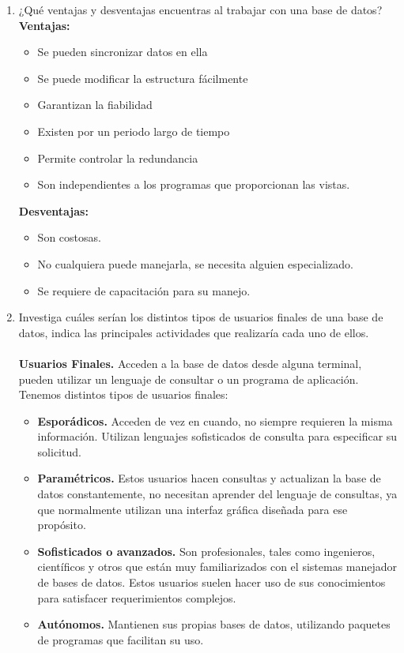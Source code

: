 \documentclass[12pt]{article}
\begin{document}
\begin{enumerate}
	\item ¿Qué ventajas y desventajas encuentras al trabajar con una
	 base de datos?\\
	 \textbf{Ventajas:}
	 \begin{itemize}
	 	\item Se pueden sincronizar datos en ella
	 	\item Se puede modificar la estructura fácilmente
	 	\item Garantizan la fiabilidad
	 	\item Existen por un periodo largo de tiempo
	 	\item Permite controlar la redundancia
	 	\item Son independientes a los programas que proporcionan las
	 	vistas.
	 \end{itemize}
 	 \textbf{Desventajas:}
 	 \begin{itemize}
 	 	\item Son costosas.
 	 	\item No cualquiera puede manejarla, se necesita alguien
 	 	especializado.
 	 	\item Se requiere de capacitación para su manejo.
 	 \end{itemize}
	 \item Investiga  cuáles  serían  los distintos tipos de
	  usuarios finales de una base de datos, indica las principales
	  actividades que realizaría cada uno de ellos. \\\\
	  \textbf{Usuarios Finales.} Acceden a la base de datos desde
	  alguna terminal, pueden utilizar un lenguaje de consultar o un
	  programa de aplicación. Tenemos distintos tipos de usuarios
	  finales:
	  \begin{itemize}
	  	\item \textbf{Esporádicos.} Acceden de vez en cuando, no
	  	siempre requieren la misma información. Utilizan lenguajes
	  	sofisticados de consulta para especificar su solicitud.\\
	  	\item \textbf{Paramétricos.} Estos usuarios hacen consultas
	  	y actualizan la base de datos constantemente, no necesitan
	  	aprender del lenguaje de consultas, ya que normalmente
	  	utilizan una interfaz gráfica diseñada para ese propósito.
	  	\item \textbf{Sofisticados o avanzados.} Son profesionales,
	  	tales como ingenieros, científicos y otros que están muy
	  	familiarizados con el sistemas manejador de bases de datos.
	  	Estos usuarios suelen hacer uso de sus conocimientos para
	  	satisfacer requerimientos complejos.
	  	\item \textbf{Autónomos.} Mantienen sus propias bases de datos, utilizando paquetes de programas que facilitan su uso.


\end{itemize}
\end{enumerate}
\end{document}
